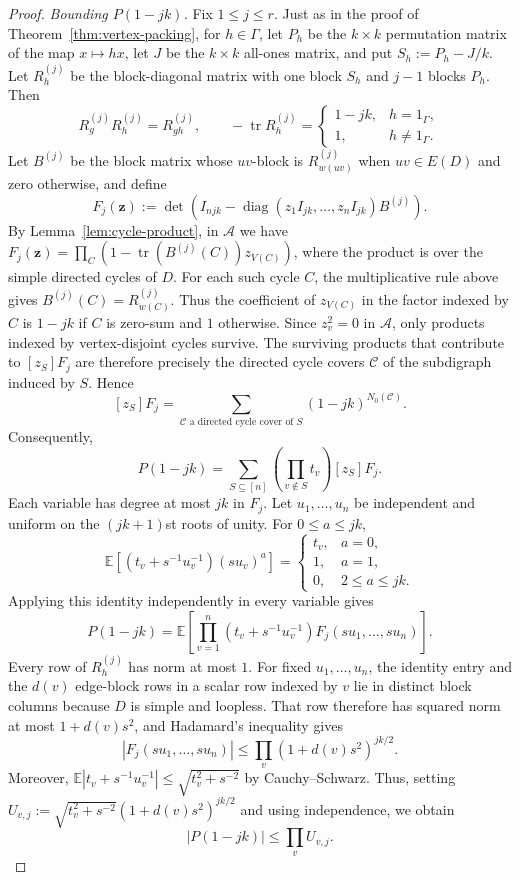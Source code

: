 \documentclass[10pt,a4paper]{amsart}
\newcommand{\diag}{\operatorname{diag}}
\newcommand{\tr}{\operatorname{tr}}
\begin{document}
\begin{proof}
\medskip\noindent
\emph{Bounding $P(1-jk)$.}
Fix $1\le j\le r$.  Just as in the proof of
Theorem~\ref{thm:vertex-packing}, for $h\in\Gamma$, let $P_h$ be the
$k\times k$ permutation matrix of the map $x\mapsto hx$, let $J$ be
the $k\times k$ all-ones matrix, and put $S_h:=P_h-J/k$.  Let
$R_h^{(j)}$ be the block-diagonal matrix with one block $S_h$ and
$j-1$ blocks $P_h$.
Then
\[
  R_g^{(j)}R_h^{(j)}=R_{gh}^{(j)},
  \qquad
  -\tr R_h^{(j)}=
  \begin{cases}
    1-jk,&h=1_\Gamma,\\
    1,&h\ne1_\Gamma.
  \end{cases}
\]
Let $B^{(j)}$ be the block matrix whose $uv$-block is
$R_{w(uv)}^{(j)}$ when $uv\in E(D)$ and zero otherwise, and define
\[
  F_j(\mathbf z)
  :=\det\left(
    I_{njk}-\diag(z_1I_{jk},\ldots,z_nI_{jk})B^{(j)}
  \right).
\]
By Lemma~\ref{lem:cycle-product}, in $\mathcal A$ we have
$F_j(\mathbf z)=\prod_C(1-\tr(B^{(j)}(C))z_{V(C)})$, where the product
is over the simple directed cycles of $D$.  For each such cycle $C$,
the multiplicative rule above gives
$B^{(j)}(C)=R_{w(C)}^{(j)}$.  Thus the coefficient of $z_{V(C)}$ in
the factor indexed by $C$ is $1-jk$ if $C$ is zero-sum and $1$
otherwise.  Since $z_v^2=0$ in $\mathcal A$, only products indexed by
vertex-disjoint cycles survive.  The surviving products that contribute
to $[z_S]F_j$ are therefore precisely the directed cycle covers
$\mathcal C$ of the subdigraph induced by $S$.  Hence
\[
  [z_S]F_j
  =\sum_{\mathcal C\text{ a directed cycle cover of }S}
  (1-jk)^{N_0(\mathcal C)}.
\]
Consequently,
\[
  P(1-jk)
  =
  \sum_{S\subseteq[n]}
  \left(\prod_{v\notin S}t_v\right)[z_S]F_j.
\]
Each variable has degree at most $jk$ in $F_j$.  Let
$u_1,\ldots,u_n$ be independent and uniform on the $(jk+1)$st roots
of unity.  For $0\le a\le jk$,
\[
  \mathbb E\left[(t_v+s^{-1}u_v^{-1})(su_v)^a\right]
  =
  \begin{cases}
    t_v,&a=0,\\
    1,&a=1,\\
    0,&2\le a\le jk.
  \end{cases}
\]
Applying this identity independently in every variable gives
\[
  P(1-jk)
  =\mathbb E\left[
    \prod_{v=1}^n(t_v+s^{-1}u_v^{-1})
    F_j(su_1,\ldots,su_n)
  \right].
\]
Every row of $R_h^{(j)}$ has norm at most $1$.  For fixed
$u_1,\ldots,u_n$, the identity entry and the $d(v)$ edge-block rows
in a scalar row indexed by $v$ lie in distinct block columns because
$D$ is simple and loopless.  That row therefore has squared norm at
most $1+d(v)s^2$, and Hadamard's inequality gives
\[
  |F_j(su_1,\ldots,su_n)|
  \le\prod_v(1+d(v)s^2)^{jk/2}.
\]
Moreover,
$\mathbb E|t_v+s^{-1}u_v^{-1}|\le\sqrt{t_v^2+s^{-2}}$ by
Cauchy--Schwarz.  Thus, setting
$U_{v,j}:=\sqrt{t_v^2+s^{-2}}(1+d(v)s^2)^{jk/2}$ and using
independence, we obtain
\begin{equation}\label{eq:eulerian-packing-upper}
  |P(1-jk)|\le\prod_vU_{v,j}.
\end{equation}


\end{proof}
\end{document}
